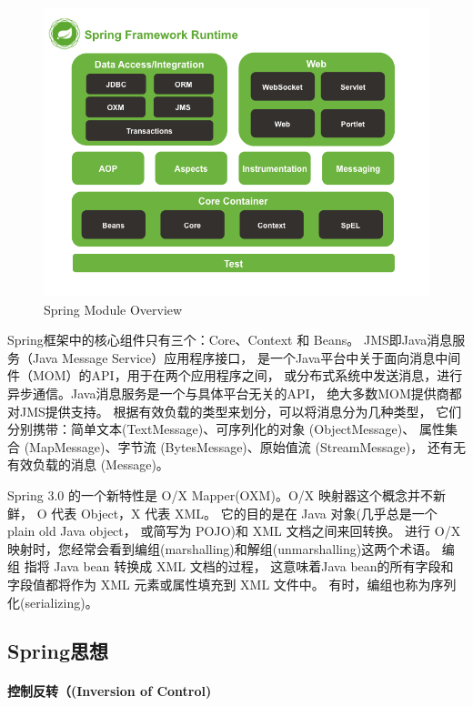\documentclass{book}
\begin{document}
\begin{figure}[htbp]
	\centering
	\includegraphics[scale=0.5]{spring-overview-current.png}
	\caption{Spring Module Overview}
	\label{code:spring-overview-current}
\end{figure}

Spring框架中的核心组件只有三个：Core、Context 和 Beans。
JMS即Java消息服务（Java Message Service）应用程序接口，
是一个Java平台中关于面向消息中间件（MOM）的API，用于在两个应用程序之间，
或分布式系统中发送消息，进行异步通信。Java消息服务是一个与具体平台无关的API，
绝大多数MOM提供商都对JMS提供支持。
根据有效负载的类型来划分，可以将消息分为几种类型，
它们分别携带：简单文本(TextMessage)、可序列化的对象 (ObjectMessage)、
属性集合 (MapMessage)、字节流 (BytesMessage)、原始值流 (StreamMessage)，
还有无有效负载的消息 (Message)。

Spring 3.0 的一个新特性是 O/X Mapper(OXM)。O/X 映射器这个概念并不新鲜，
O 代表 Object，X 代表 XML。
它的目的是在 Java 对象(几乎总是一个 plain old Java object，
或简写为 POJO)和 XML 文档之间来回转换。
进行 O/X 映射时，您经常会看到编组(marshalling)和解组(unmarshalling)这两个术语。
编组 指将 Java bean 转换成 XML 文档的过程，
这意味着Java bean的所有字段和字段值都将作为 XML 元素或属性填充到 XML 文件中。
有时，编组也称为序列化(serializing)。

\subsection{Spring思想}

\paragraph{控制反转（(Inversion of Control)}
\end{document}
